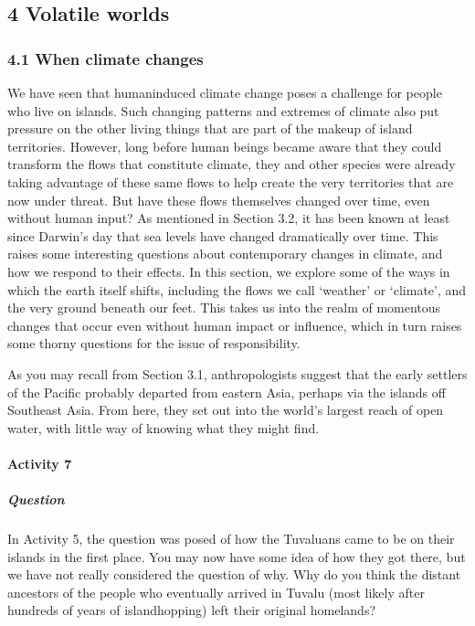 \documentclass[letterpaper,10pt,english]{sphinxmanual}
\begin{document}
\subsection{4 Volatile worlds}
\label{\detokenize{content/session_00/Part_00_04:4-Volatile-worlds}}\label{\detokenize{content/session_00/Part_00_04::doc}}

\subsubsection{4.1 When climate changes}
\label{\detokenize{content/session_00/Part_00_04:4.1-When-climate-changes}}
We have seen that human\sphinxhyphen{}induced climate change poses a challenge for people who live on islands. Such changing patterns and extremes of climate also put pressure on the other living things that are part of the make\sphinxhyphen{}up of island territories. However, long before human beings became aware that they could transform the flows that constitute climate, they and other species were already taking advantage of these same flows to help create the very territories that are now under threat. But have these
flows themselves changed over time, even without human input? As mentioned in Section 3.2, it has been known at least since Darwin’s day that sea levels have changed dramatically over time. This raises some interesting questions about contemporary changes in climate, and how we respond to their effects. In this section, we explore some of the ways in which the earth itself shifts, including the flows we call ‘weather’ or ‘climate’, and the very ground beneath our feet. This takes us into the
realm of momentous changes that occur even without human impact or influence, which in turn raises some thorny questions for the issue of responsibility.

As you may recall from Section 3.1, anthropologists suggest that the early settlers of the Pacific probably departed from eastern Asia, perhaps via the islands off Southeast Asia. From here, they set out into the world’s largest reach of open water, with little way of knowing what they might find.


\paragraph{Activity 7}
\label{\detokenize{content/session_00/Part_00_04:Activity-7}}

\subparagraph{Question}
\label{\detokenize{content/session_00/Part_00_04:Question}}
In Activity 5, the question was posed of how the Tuvaluans came to be on their islands in the first place. You may now have some idea of how they got there, but we have not really considered the question of why. Why do you think the distant ancestors of the people who eventually arrived in Tuvalu (most likely after hundreds of years of island\sphinxhyphen{}hopping) left their original homelands?
\end{document}
